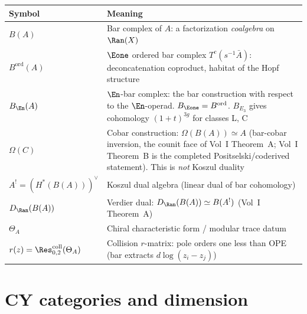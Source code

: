 \begin{center}
\begin{tabular}{@{}lp{8cm}@{}}
\toprule
\textbf{Symbol} & \textbf{Meaning} \\
\midrule
$B(A)$ & Bar complex of $A$: a factorization \emph{coalgebra} on $\Ran(X)$ \\
$B^{\mathrm{ord}}(A)$ & $\Eone$ ordered bar complex
 $T^c(s^{-1}\bar{A})$: deconcatenation coproduct,
 habitat of the Hopf structure \\
$B_{\En}(A)$ & $\En$-bar complex: the bar construction with
 respect to the $\En$-operad. $B_{\Eone} = B^{\mathrm{ord}}$.
 $B_{E_3}$ gives cohomology $(1+t)^{3g}$ for classes L, C \\
$\Omega(C)$ & Cobar construction: $\Omega(B(A)) \simeq A$
 (bar-cobar inversion, the counit face of Vol~I Theorem~A; Vol~I
 Theorem~B is the completed Positselski/coderived statement).
 This is \emph{not} Koszul duality \\
$A^! = (H^*(B(A)))^\vee$ & Koszul dual algebra (linear dual of bar cohomology) \\
$D_{\Ran}(B(A))$ & Verdier dual: $D_{\Ran}(B(A)) \simeq B(A^!)$
 (Vol~I Theorem~A) \\
$\Theta_A$ & Chiral characteristic form / modular trace datum \\
$r(z) = \Res^{\mathrm{coll}}_{0,2}(\Theta_A)$ & Collision
 $r$-matrix: pole orders one less than OPE (bar extracts
 $d\log(z_i - z_j)$) \\
\bottomrule
\end{tabular}
\end{center}

\section{CY categories and dimension}
\label{sec:nc-cy}


